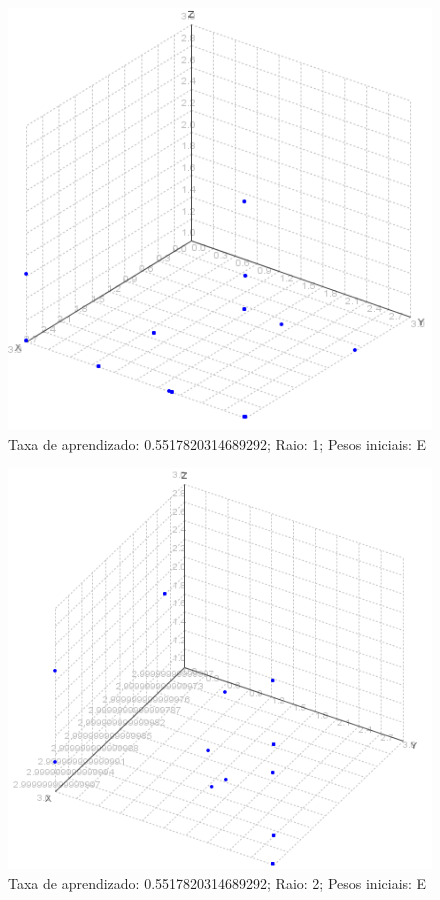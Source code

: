 \begin{figure}[ht!]
	\centering
	\includegraphics[scale=0.65]{./imgs/2e1.png}
	\caption{Taxa de aprendizado: 0.5517820314689292; Raio: 1; Pesos iniciais: E}
\end{figure}

\newpage
\begin{figure}[ht!]
	\centering
	\includegraphics[scale=0.65]{./imgs/2e2.png}
	\caption{Taxa de aprendizado: 0.5517820314689292; Raio: 2; Pesos iniciais: E}
\end{figure}
